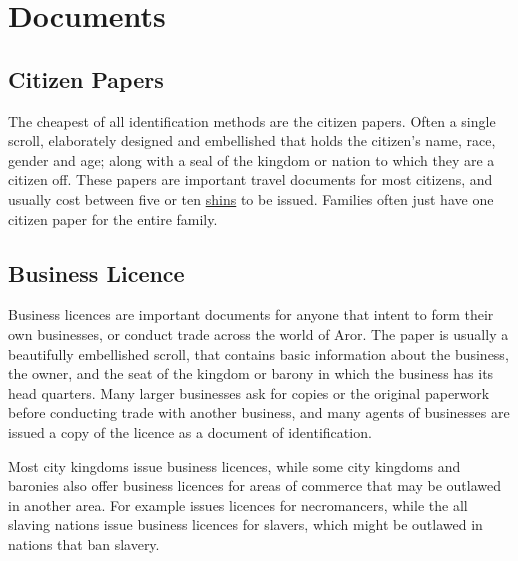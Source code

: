 \section{Documents}
\label{sec:Documents}

\subsection{Citizen Papers}
\label{sec:Citizen Papers}

The cheapest of all identification methods are the citizen papers. Often a
single scroll, elaborately designed and embellished that holds the citizen's
name, race, gender and age; along with a seal of the kingdom or nation to
which they are a citizen off. These papers are important travel documents for
most citizens, and usually cost between five or ten \hyperref[sec:Shin]{shins}
to be issued. Families often just have one citizen paper for the entire family.

\subsection{Business Licence}
\label{sec:Business Licence}

Business licences are important documents for anyone that intent to form their
own businesses, or conduct trade across the world of Aror. The paper is usually
a beautifully embellished scroll, that contains basic information about the
business, the owner, and the seat of the kingdom or barony in which the business
has its head quarters. Many larger businesses ask for copies or the original
paperwork before conducting trade with another business, and many agents of
businesses are issued a copy of the licence as a document of identification.

Most city kingdoms issue business licences, while some city kingdoms and
baronies also offer business licences for areas of commerce that may be
outlawed in another area. For example  issues licences
for necromancers, while the all slaving nations issue business licences for
slavers, which might be outlawed in nations that ban slavery.
